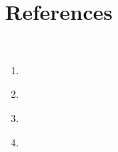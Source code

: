 \documentclass[11pt]{article}
\begin{document}
\section{References}
\

\begin{enumerate}
    \item \cite{ambjorn2012nonperturbative}
    \item \cite{ashtekar2006quantum}
    \item \cite{baum2020thermal}
    \item \cite{penrose2010cycles}
\end{enumerate}










\end{document}
